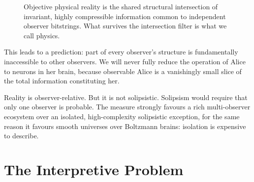 \begin{figure}[htbp]
\centering
{}
\caption{Objective physical reality is the shared structural intersection
of invariant, highly compressible information common to independent
observer bitstrings. What survives the intersection filter is what we
call physics.}
\label{fig:diag4}
\end{figure}

This leads to a prediction: part of every observer's structure is
fundamentally inaccessible to other observers. We will never fully
reduce the operation of Alice to neurons in her brain, because
observable Alice is a vanishingly small slice of the total information
constituting her.

Reality is observer-relative. But it is not solipsistic. Solipsism
would require that only one observer is probable. The measure strongly
favours a rich multi-observer ecosystem over an isolated, high-complexity
solipsistic exception, for the same reason it favours smooth universes
over Boltzmann brains: isolation is expensive to describe.


\section{The Interpretive Problem}
\label{sec:interpretation-problem}

